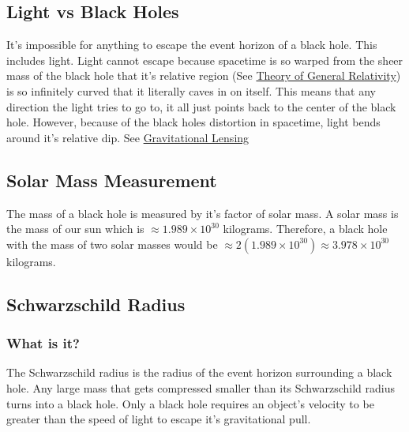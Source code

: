 \documentclass{article}
\begin{document}
\subsection{Light vs Black Holes}
It's impossible for anything to escape the event horizon of a black hole. This includes light. Light cannot escape because spacetime is so warped from the sheer mass of the black hole that it's relative region (See \hyperref[sec:generalrelativity]{Theory of General Relativity}) is so infinitely curved that it literally caves in on itself. This means that any direction the light tries to go to, it all just points back to the center of the black hole.
However, because of the black holes distortion in spacetime, light bends around it's relative dip. See \hyperref[sec:gravitational_lensing]{Gravitational Lensing}

\subsection{Solar Mass Measurement}
The mass of a black hole is measured by it's factor of solar mass. A solar mass is the mass of our sun which is \hyperref[constants]{$\approx 1.989 \times 10^{30}$} kilograms. Therefore, a black hole with the mass of two solar masses would be $\approx 2(1.989 \times 10^{30}) \approx 3.978 \times 10^{30}$ kilograms.

\subsection{Schwarzschild Radius}
\subsubsection{What is it?}
The Schwarzschild radius is the radius of the event horizon surrounding a black hole. Any large mass that gets compressed smaller than its Schwarzschild radius turns into a black hole. Only a black hole requires an object's velocity to be greater than the speed of light to escape it's gravitational pull.
\end{document}

